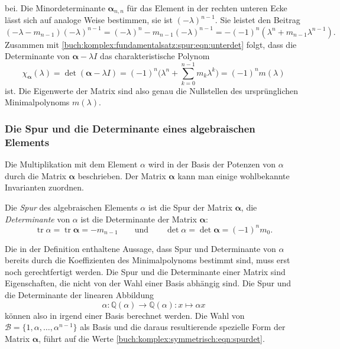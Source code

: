 bei.
Die Minordeterminante $\bm{\alpha}_{n,n}$ für das Element in der rechten
unteren Ecke lässt sich auf analoge Weise bestimmen, sie ist
$(-\lambda)^{n-1}$.
Sie leistet den Beitrag
\[
(-\lambda-m_{n-1})(-\lambda)^{n-1}
=
(-\lambda)^n - m_{n-1}(-\lambda)^{n-1}
=
-
(-1)^n
(\lambda^n + m_{n-1}\lambda^{n-1}).
\]
Zusammen mit \eqref{buch:komplex:fundamentalsatz:spur:eqn:unterdet}
folgt, dass die Determinante von $\bm{\alpha}-\lambda I$ das charakteristische
Polynom
\[
\chi_{\bm{\alpha}}(\lambda)
=
\det (\bm{\alpha}-\lambda I)
=
(-1)^n\biggl(
\lambda^n
+
\sum_{k=0}^{n-1} m_k \lambda^k
\biggr)
=
(-1)^n m(\lambda)
\]
ist.
Die Eigenwerte der Matrix sind also genau die Nullstellen des
ursprünglichen Minimalpolynoms $m(\lambda)$.

%
%
\subsubsection{Die Spur und die Determinante eines algebraischen Elements}
Die Multiplikation mit dem Element $\alpha$ wird in der Basis der
Potenzen von $\alpha$ durch die Matrix $\bm{\alpha}$ 
beschrieben.
Der Matrix $\bm{\alpha}$ kann man einige wohlbekannte Invarianten
zuordnen.

\begin{definition}
Die \emph{Spur} des algebraischen Elements $\alpha$ ist die Spur der
%
%
Matrix $\bm{\alpha}$, die \emph{Determinante} von $\alpha$ ist die
Determinante der Matrix $\bm{\alpha}$:
\begin{equation}
\operatorname{tr}\alpha
=
\operatorname{tr}\bm{\alpha}
=
-m_{n-1}
\qquad\text{und}\qquad
\det\alpha
=
\det\bm{\alpha}
=
(-1)^nm_0.
\label{buch:komplex:symmetrisch:eqn:spurdet}
\end{equation}
\end{definition}

Die in der Definition enthaltene Aussage, dass Spur und Determinante
von $\alpha$ bereits durch die Koeffizienten des Minimalpolynoms bestimmt
sind, muss erst noch gerechtfertigt werden.
Die Spur und die Determinante einer Matrix sind Eigenschaften,
die nicht von der Wahl einer Basis abhängig sind.
Die Spur und die Determinante der linearen Abbildung
\[
\alpha\colon \mathbb{Q}(\alpha) \to \mathbb{Q}(\alpha) : x \mapsto \alpha x
\]
können also in irgend einer Basis berechnet werden.
Die Wahl von $\mathscr{B}=\{1,\alpha,\dots,\alpha^{n-1}\}$ als Basis
und die daraus resultierende spezielle Form der Matrix $\bm{\alpha}$,
führt auf die Werte \eqref{buch:komplex:symmetrisch:eqn:spurdet}.


